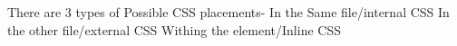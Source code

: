 There are 3 types of Possible CSS placements-
In the Same file/internal CSS
In the other file/external CSS
Withing the element/Inline CSS